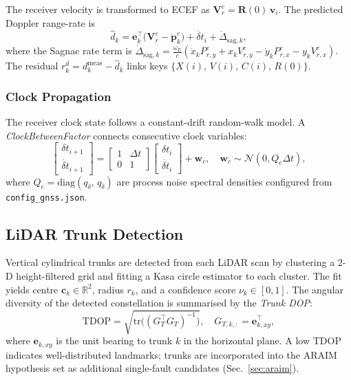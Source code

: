\documentclass[journal]{IEEEtran}
\newcommand{\R}{\mathbb{R}}
\newcommand{\Rext}{\mathbf{R}}        %
\newcommand{\ve}{\mathbf{v}}
\newcommand{\diag}{\mathrm{diag}}
\newcommand{\tr}{\mathrm{tr}}
\begin{document}
The receiver velocity is transformed to ECEF as
$\mathbf{V}_r^e = \Rext(0)\,\ve_i$.
The predicted Doppler range-rate is
\begin{equation}
  \hat{d}_k = \mathbf{e}_k^\top\!\bigl(\mathbf{V}_r^e -
    \dot{\mathbf{p}}_k^e\bigr)
  + \dot{\delta t}_i + \dot{\Delta}_{\mathrm{sag},k},
  \label{eq:dop_pred}
\end{equation}
where the Sagnac rate term is
$\dot{\Delta}_{\mathrm{sag},k} = \tfrac{\omega_E}{c}
(\dot{x}_k P_{r,y}^e + x_k V_{r,y}^e - \dot{y}_k P_{r,x}^e - y_k V_{r,x}^e)$.
The residual $r_k^d = d_k^{\mathrm{meas}} - \hat{d}_k$ links keys
$\{X(i),\,V(i),\,C(i),\,R(0)\}$.

\subsubsection{Clock Propagation}

The receiver clock state follows a constant-drift random-walk model.
A \textit{ClockBetweenFactor} connects consecutive clock variables:
\begin{equation}
  \begin{bmatrix}\delta t_{i+1}\\\dot{\delta t}_{i+1}\end{bmatrix}
  = \begin{bmatrix}1 & \Delta t \\ 0 & 1\end{bmatrix}
    \begin{bmatrix}\delta t_i\\\dot{\delta t}_i\end{bmatrix}
  + \mathbf{w}_c, \quad
  \mathbf{w}_c \sim \mathcal{N}(0, Q_c \Delta t),
  \label{eq:clock_model}
\end{equation}
where $Q_c = \diag(q_\delta,\, q_{\dot\delta})$ are process noise
spectral densities configured from \texttt{config\_gnss.json}.

\subsection{LiDAR Trunk Detection}
\label{sec:trunk}

Vertical cylindrical trunks are detected from each LiDAR scan by
clustering a 2-D height-filtered grid and fitting a Kasa circle
estimator to each cluster.  The fit yields centre $\mathbf{c}_k \in \R^2$,
radius $r_k$, and a confidence score $\nu_k \in [0,1]$.  The angular
diversity of the detected constellation is summarised by the
\emph{Trunk DOP}:
\begin{equation}
  \mathrm{TDOP} = \sqrt{\tr\!\bigl((G_T^\top G_T)^{-1}\bigr)},
  \quad G_{T,k,:} = \mathbf{e}_{k,xy}^\top,
  \label{eq:tdop}
\end{equation}
where $\mathbf{e}_{k,xy}$ is the unit bearing to trunk $k$ in the
horizontal plane.  A low TDOP indicates well-distributed landmarks;
trunks are incorporated into the ARAIM hypothesis set as additional
single-fault candidates (Sec.~\ref{sec:araim}).
\end{document}
